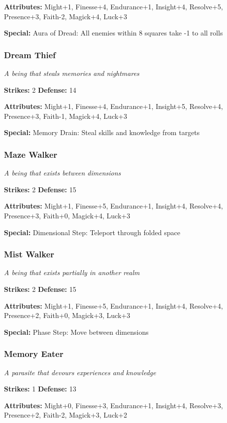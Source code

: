 \documentclass[10pt,twoside]{article}
\begin{document}
\textbf{Attributes:} Might+1, Finesse+4, Endurance+1, Insight+4, Resolve+5, Presence+3, Faith-2, Magick+4, Luck+3

\textbf{Special:} Aura of Dread: All enemies within 8 squares take -1 to all rolls

\subsubsection{Dream Thief}
\textit{A being that steals memories and nightmares}

\textbf{Strikes:} 2 \quad \textbf{Defense:} 14

\textbf{Attributes:} Might+1, Finesse+4, Endurance+1, Insight+5, Resolve+4, Presence+3, Faith-1, Magick+4, Luck+3

\textbf{Special:} Memory Drain: Steal skills and knowledge from targets

\subsubsection{Maze Walker}
\textit{A being that exists between dimensions}

\textbf{Strikes:} 2 \quad \textbf{Defense:} 15

\textbf{Attributes:} Might+1, Finesse+5, Endurance+1, Insight+4, Resolve+4, Presence+3, Faith+0, Magick+4, Luck+3

\textbf{Special:} Dimensional Step: Teleport through folded space

\subsubsection{Mist Walker}
\textit{A being that exists partially in another realm}

\textbf{Strikes:} 2 \quad \textbf{Defense:} 15

\textbf{Attributes:} Might+1, Finesse+5, Endurance+1, Insight+4, Resolve+4, Presence+2, Faith+0, Magick+3, Luck+3

\textbf{Special:} Phase Step: Move between dimensions

\subsubsection{Memory Eater}
\textit{A parasite that devours experiences and knowledge}

\textbf{Strikes:} 1 \quad \textbf{Defense:} 13

\textbf{Attributes:} Might+0, Finesse+3, Endurance+1, Insight+4, Resolve+3, Presence+2, Faith-2, Magick+3, Luck+2
\end{document}

